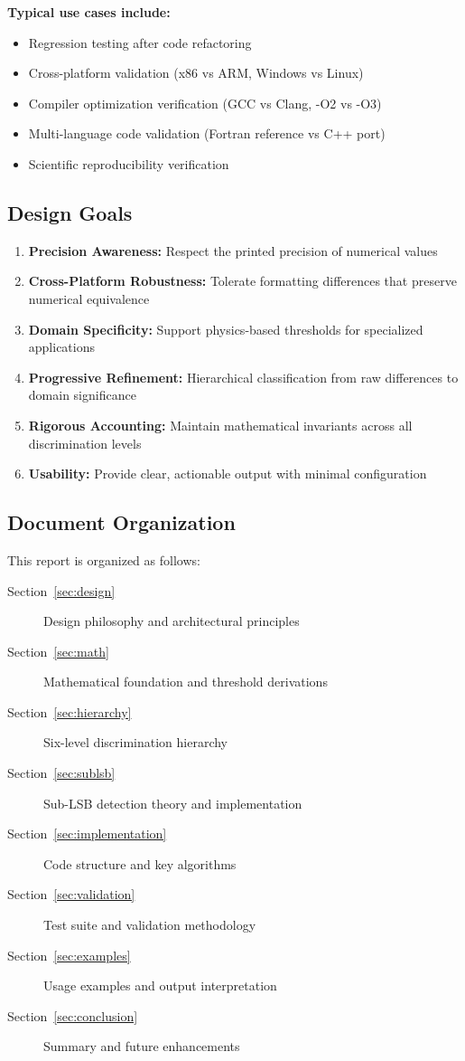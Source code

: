 \textbf{Typical use cases include:}
\begin{itemize}
    \item Regression testing after code refactoring
    \item Cross-platform validation (x86 vs ARM, Windows vs Linux)
    \item Compiler optimization verification (GCC vs Clang, -O2 vs -O3)
    \item Multi-language code validation (Fortran reference vs C++ port)
    \item Scientific reproducibility verification
\end{itemize}

\subsection{Design Goals}

\begin{enumerate}
    \item \textbf{Precision Awareness:} Respect the printed precision of numerical values
    \item \textbf{Cross-Platform Robustness:} Tolerate formatting differences that preserve numerical equivalence
    \item \textbf{Domain Specificity:} Support physics-based thresholds for specialized applications
    \item \textbf{Progressive Refinement:} Hierarchical classification from raw differences to domain significance
    \item \textbf{Rigorous Accounting:} Maintain mathematical invariants across all discrimination levels
    \item \textbf{Usability:} Provide clear, actionable output with minimal configuration
\end{enumerate}

\subsection{Document Organization}

This report is organized as follows:

\begin{description}
    \item[Section~\ref{sec:design}] Design philosophy and architectural principles
    \item[Section~\ref{sec:math}] Mathematical foundation and threshold derivations
    \item[Section~\ref{sec:hierarchy}] Six-level discrimination hierarchy
    \item[Section~\ref{sec:sublsb}] Sub-LSB detection theory and implementation
    \item[Section~\ref{sec:implementation}] Code structure and key algorithms
    \item[Section~\ref{sec:validation}] Test suite and validation methodology
    \item[Section~\ref{sec:examples}] Usage examples and output interpretation
    \item[Section~\ref{sec:conclusion}] Summary and future enhancements
\end{description}
